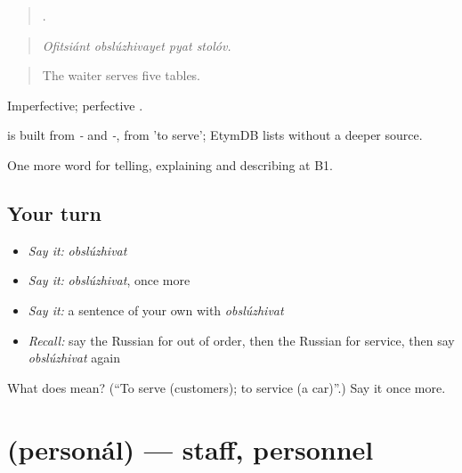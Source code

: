 \begin{quote}
   .
\end{quote}

\begin{quote}
\emph{Ofitsiánt obslúzhivayet pyat stolóv.}
\end{quote}

\begin{quote}
The waiter serves five tables.
\end{quote}

Imperfective; perfective \emph{}.

\begin{cousinweb}
\emph{} is built from \emph{-} and \emph{-}, from \emph{} 'to serve'; EtymDB lists \emph{} without a deeper source.
\end{cousinweb}

\begin{grammarlens}[title={What you've built}]
One more word for telling, explaining and describing at B1.
\end{grammarlens}

\subsection*{Your turn}
\begin{itemize}
\raggedright
  \item \emph{Say it:} \emph{obslúzhivat}
  \item \emph{Say it:} \emph{obslúzhivat}, once more
  \item \emph{Say it:} a sentence of your own with \emph{obslúzhivat}
  \item \emph{Recall:} say the Russian for out of order, then the Russian for service, then say \emph{obslúzhivat} again
\end{itemize}

\begin{tcolorbox}[breakable,colback=teal!4,colframe=teal!35!black,title={Before you move on}]
What does  mean? (\textquotedblleft{}To serve (customers); to service (a car)\textquotedblright{}.) Say it once more.
\end{tcolorbox}
\section[\texorpdfstring{\ru{персонал} (personál)}{персонал (personál)}]{ (personál) — staff, personnel}

